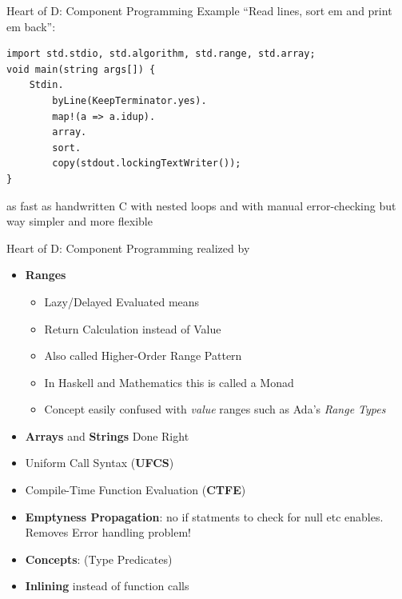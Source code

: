 \documentclass[xcolor=dvipsnames]{beamer}
\begin{document}
\begin{frame}[fragile]{Heart of D: Component Programming Example}
  ``Read lines, sort em and print em back'':
\begin{lstlisting}[frame=single]
import std.stdio, std.algorithm, std.range, std.array;
void main(string args[]) {
    Stdin.
        byLine(KeepTerminator.yes).
        map!(a => a.idup).
        array.
        sort.
        copy(stdout.lockingTextWriter());
}
\end{lstlisting}
as fast as handwritten C with nested loops and with manual error-checking but
way simpler and more flexible
\end{frame}

\begin{frame}[fragile]{Heart of D: Component Programming realized by}
  \begin{itemize}[<+->]
  \item \textbf{Ranges}
    \begin{itemize}[<+->]
    \item Lazy/Delayed Evaluated means
    \item Return Calculation instead of Value
    \item Also called Higher-Order Range Pattern
    \item In Haskell and Mathematics this is called a Monad
    \item Concept easily confused with \emph{value} ranges such as Ada's
      \emph{Range Types}
    \end{itemize}
  \item \textbf{Arrays} and \textbf{Strings} Done Right
  \item Uniform Call Syntax (\textbf{UFCS})
  \item Compile-Time Function Evaluation (\textbf{CTFE})
  \item \textbf{Emptyness Propagation}: no if statments to check for null etc
    enables. Removes Error handling problem!
  \item \textbf{Concepts}: (Type Predicates)
  \item \textbf{Inlining} instead of function calls
  \end{itemize}
\end{frame}
\end{document}
